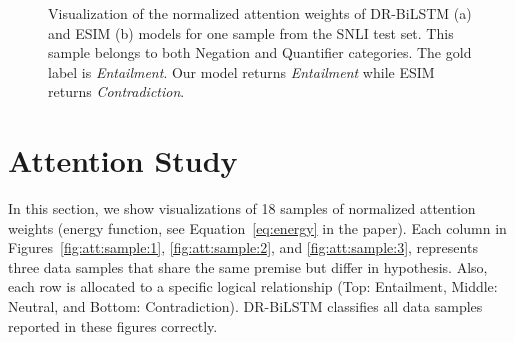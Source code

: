 \documentclass[11pt,a4paper]{article}
\begin{document}
	
	\begin{figure}[ht]
		\begin{center}
		\end{center}
		\caption{
			Visualization of the normalized attention weights of DR-BiLSTM (a) and ESIM (b) models for one sample from the SNLI test set. This sample belongs to both Negation and Quantifier categories. The gold label is \emph{Entailment}. Our model returns \emph{Entailment} while ESIM returns \emph{Contradiction}.
		}
		\label{fig:att:ana:cat4}
	\end{figure}
	
	\section{Attention Study}
	\label{app:att:sec}
	
	In this section, we show visualizations of 18 samples of normalized attention weights (energy function, see Equation~\ref{eq:energy} in the paper). Each column in Figures~\ref{fig:att:sample:1}, \ref{fig:att:sample:2}, and \ref{fig:att:sample:3}, represents three data samples that share the same premise but differ in hypothesis. Also, each row is allocated to a specific logical relationship (Top: Entailment, Middle: Neutral, and Bottom: Contradiction). DR-BiLSTM classifies all data samples reported in these figures correctly.
	
\end{document}
